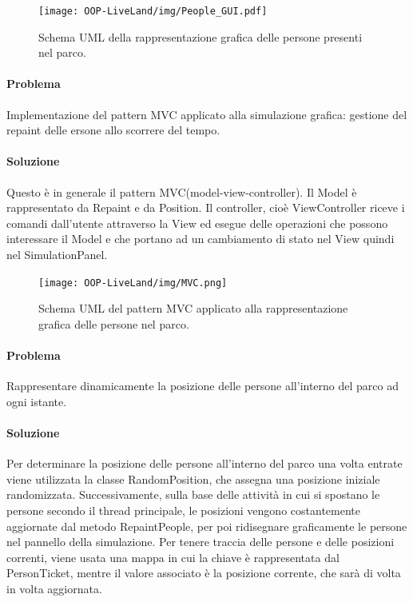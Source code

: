 \documentclass[a4paper,12pt]{report}
\begin{document}
\begin{figure}[h]
\centering{}
\texttt{[image: OOP-LiveLand/img/People\_GUI.pdf]}
\caption{Schema UML della rappresentazione grafica delle persone presenti nel parco.}
\label{img:People_GUI}
\end{figure}

\paragraph{Problema} Implementazione del pattern MVC applicato alla simulazione grafica: gestione del repaint delle ersone allo scorrere del tempo.
\paragraph{Soluzione} Questo è in generale il pattern MVC(model-view-controller). Il Model è rappresentato da Repaint e da Position. Il controller, cioè ViewController riceve i comandi dall’utente attraverso la View ed esegue delle operazioni che possono interessare il Model e che portano ad un cambiamento di stato nel View quindi nel SimulationPanel. 

\begin{figure}[h]
\centering{}
\texttt{[image: OOP-LiveLand/img/MVC.png]}
\caption{Schema UML del pattern MVC applicato alla rappresentazione grafica delle persone nel parco.}
\label{img:MVC}
\end{figure}

\paragraph{Problema} Rappresentare dinamicamente la posizione delle persone all'interno del parco ad ogni istante.
\paragraph{Soluzione} Per determinare la posizione delle persone all'interno del parco una volta entrate viene utilizzata la classe RandomPosition, che assegna una posizione iniziale randomizzata. Successivamente, sulla base delle attività in cui si spostano le persone secondo il thread principale, le posizioni vengono costantemente aggiornate dal metodo RepaintPeople, per poi ridisegnare graficamente le persone nel pannello della simulazione. Per tenere traccia delle persone e delle posizioni correnti, viene usata una mappa in cui la chiave è rappresentata dal PersonTicket, mentre il valore associato è la posizione corrente, che sarà di volta in volta aggiornata.
\end{document}
